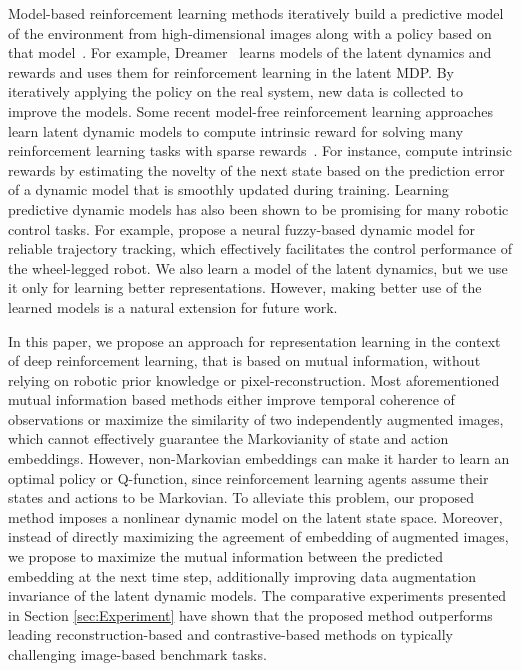 \documentclass[a4paper,12pt]{article}
\begin{document}
Model-based reinforcement learning methods iteratively build a predictive model of the environment from high-dimensional images along with a policy based on that model~\cite{hafner2019learning, finn2017deep, zhang2019solar, agrawal2016learning}. For example, Dreamer~\cite{hafner2020Dream} learns models of the latent dynamics and rewards and uses them for reinforcement learning in the latent MDP. By iteratively applying the policy on the real system, new data is collected to improve the models. Some recent model-free reinforcement learning approaches learn latent dynamic models to compute intrinsic reward for solving many reinforcement learning tasks with sparse rewards~\cite{pathak2017curiosity, li2020random}. For instance,  \citet{li2020random} compute intrinsic rewards by estimating the novelty of the next state based on the prediction error of a dynamic model that is smoothly updated during training. Learning predictive dynamic models has also been shown to be promising for many robotic control tasks. For example, \citet{li2020neural} propose a neural fuzzy-based dynamic model for reliable trajectory tracking, which effectively facilitates the control performance of the wheel-legged robot. We also learn a model of the latent dynamics, but we use it only for learning better representations. However, making better use of the learned models is a natural extension for future work.

In this paper, we propose an approach for representation learning in the context of deep reinforcement learning, that is based on mutual information, without relying on robotic prior knowledge or pixel-reconstruction. Most aforementioned mutual information based methods either improve temporal coherence of observations or maximize the similarity of two independently augmented images, which cannot effectively guarantee the Markovianity of state and action embeddings. However, non-Markovian embeddings can make it harder to learn an optimal policy or Q-function, since reinforcement learning agents assume their states and actions to be Markovian. To alleviate this problem, our proposed method imposes a nonlinear dynamic model on the latent state space. Moreover, instead of directly maximizing the agreement of embedding of augmented images, we propose to maximize the mutual information between the predicted embedding at the next time step, additionally improving data augmentation invariance of the latent dynamic models. The comparative experiments presented in Section \ref{sec:Experiment} have shown that the proposed method outperforms leading reconstruction-based and contrastive-based methods on typically challenging image-based benchmark tasks.
\end{document}

